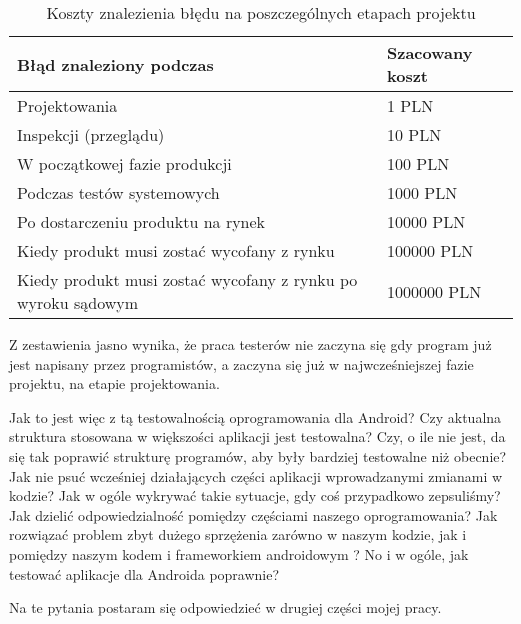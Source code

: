 \begin{table}[]
\centering
\caption{Koszty znalezienia błędu na poszczególnych etapach projektu}
\label{tab:sample_table}
\begin{tabular}{|l|l|}
\hline
\textbf{Błąd znaleziony podczas} & \textbf{Szacowany koszt} \\ \hline
Projektowania & 1 PLN	\\ \hline
Inspekcji (przeglądu) & 10 PLN	\\ \hline
W początkowej fazie produkcji & 100 PLN	\\ \hline
Podczas testów systemowych & 1000 PLN	\\ \hline
Po dostarczeniu produktu na rynek & 10000 PLN	\\ \hline
Kiedy produkt musi zostać wycofany z rynku & 100000 PLN	\\ \hline
Kiedy produkt musi zostać wycofany z rynku po wyroku sądowym & 1000000 PLN	\\ \hline
\end{tabular}
\end{table}

Z zestawienia jasno wynika, że praca testerów nie zaczyna się gdy program już jest napisany przez programistów, a zaczyna się już w najwcześniejszej fazie projektu, na etapie projektowania.

Jak to jest więc z tą testowalnością oprogramowania dla Android? Czy aktualna struktura stosowana w większości aplikacji jest testowalna? Czy, o ile nie jest, da się tak poprawić strukturę programów, aby były bardziej testowalne niż obecnie? Jak nie psuć wcześniej działających części aplikacji wprowadzanymi zmianami w kodzie? Jak w ogóle wykrywać takie sytuacje, gdy coś przypadkowo zepsuliśmy? Jak dzielić odpowiedzialność pomiędzy częściami naszego oprogramowania? Jak rozwiązać problem zbyt dużego sprzężenia zarówno w naszym kodzie, jak i pomiędzy naszym kodem i frameworkiem androidowym ? No i w ogóle, jak testować aplikacje dla Androida poprawnie?

Na te pytania postaram się odpowiedzieć w drugiej części mojej pracy.



